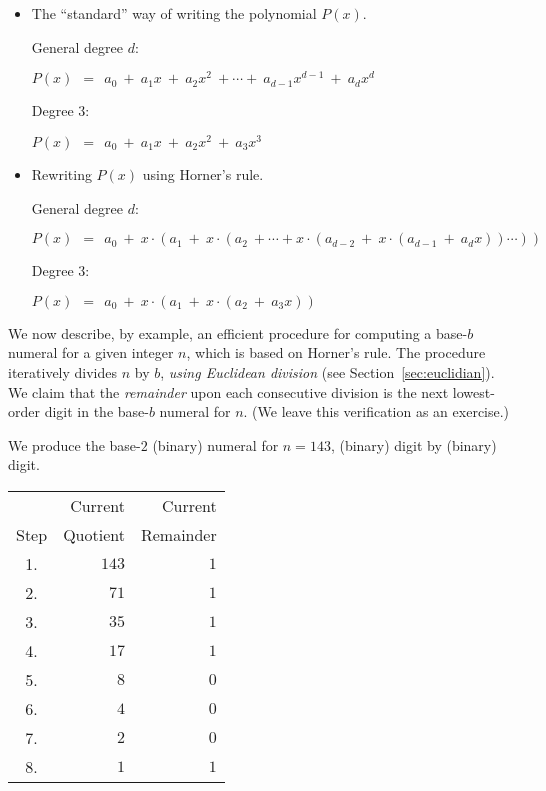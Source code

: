 \begin{itemize}
\item {\small\sf The ``standard'' way of writing the polynomial $P(x)$.}

\noindent General degree $d$:

$P(x) \ \ = \ \ a_0 \ + \ a_1 x \ + \ a_2 x^2 \ + \cdots + \ a_{d-1} x^{d-1} \ + \ a_d x^d$

\noindent Degree $3$:

$P(x) \ \ = \ \ a_0 \ + \ a_1 x \ + \ a_2 x^2 \ + \ a_3 x^3$

\item {\small\sf Rewriting $P(x)$ using Horner's rule.}

\noindent General degree $d$:

$P(x) \ \ = \ \ a_0 \ + \ x \cdot (a_1 \ + \ x \cdot (a_2  \ +  \cdots
+ x \cdot (a_{d-2} \ + \ x \cdot (a_{d-1} \ + \ a_d x)) \cdots ))$  

\noindent Degree $3$:

$P(x) \ \ = \ \ a_0 \ + \ x \cdot (a_1 \ + \ x \cdot (a_2  \ + \ a_3 x))$ 
\end{itemize}

\bigskip

\noindent
We now describe, by example, an efficient procedure for computing a base-$b$ numeral for a given integer $n$, which is based on Horner's rule.  The procedure iteratively divides $n$ by $b$, {\em using Euclidean division} (see Section~\ref{sec:euclidian}).  We claim that the {\em remainder} upon each consecutive division is the next lowest-order digit in the base-$b$ numeral for $n$.  (We leave this verification as an exercise.)

\bigskip

We produce the base-$2$ (binary) numeral for $n = 143$, (binary) digit
by (binary) digit.

\bigskip

\hspace*{.35in}
\begin{tabular}{|c|r|r|}
\hline
         & Current  & Current \\
Step & Quotient & Remainder \\
\hline
1. & $143$ & $1$ \\
2. & $71$  & $1$ \\
3. & $35$  & $1$ \\
4. & $17$  & $1$ \\
5. & $8$   & $0$ \\
6. & $4$   & $0$ \\
7. & $2$   & $0$ \\
8. & $1$   & $1$ \\
\hline
\end{tabular}

